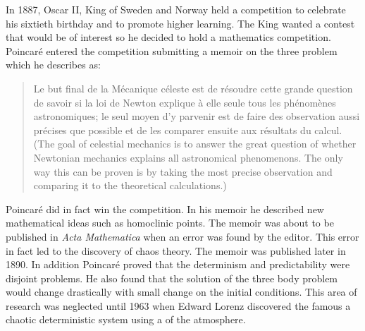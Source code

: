 \documentclass[12pt]{article}
\begin{document}
In 1887, Oscar II, King of Sweden and Norway held a competition to celebrate his sixtieth birthday and to promote higher learning.\cite{EE}  The King wanted a contest that would be of interest so he decided to hold a mathematics competition.  Poincar\'e entered the competition submitting a memoir on the three  problem which he describes  as:
\begin{quote}
Le but final de la M\'ecanique c\'eleste est de r\'esoudre cette grande question de savoir si la loi de Newton explique \`a elle seule tous les ph\'enom\`enes astronomiques; le seul moyen d'y parvenir est de faire des observation aussi pr\'ecises que possible et de les comparer ensuite aux r\'esultats du calcul.  (The goal of celestial mechanics is to answer the great question of whether Newtonian mechanics explains all astronomical phenomenons. The only way this can be proven is by taking the most precise observation and comparing it to the theoretical calculations.) \cite{PHMC}
\end{quote}
Poincar\'e did in fact win the competition.  In his memoir he described new mathematical ideas such as homoclinic points. The memoir was about to be published in \emph{Acta Mathematica} when an error was found by the editor.  This error in fact led to the discovery of chaos theory. The memoir was published later in 1890.\cite{MT}  In addition Poincar\'e proved that the determinism and predictability were disjoint problems. He also found that the solution of the three body problem would change drastically with small change on the initial conditions.  This area of research was neglected until 1963 when Edward Lorenz discovered the famous a chaotic deterministic system using a  of the atmosphere.\cite{MM} 

\end{document}
